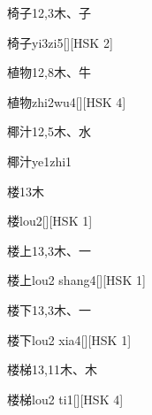 \begin{entry}{椅子}{12,3}{⽊、⼦}
  \begin{phonetics}{椅子}{yi3zi5}[][HSK 2]
  \end{phonetics}
\end{entry}

\begin{entry}{植物}{12,8}{⽊、⽜}
  \begin{phonetics}{植物}{zhi2wu4}[][HSK 4]
  \end{phonetics}
\end{entry}

\begin{entry}{椰汁}{12,5}{⽊、⽔}
  \begin{phonetics}{椰汁}{ye1zhi1}
  \end{phonetics}
\end{entry}

\begin{entry}{楼}{13}{⽊}
  \begin{phonetics}{楼}{lou2}[][HSK 1]
  \end{phonetics}
\end{entry}

\begin{entry}{楼上}{13,3}{⽊、⼀}
  \begin{phonetics}{楼上}{lou2 shang4}[][HSK 1]
  \end{phonetics}
\end{entry}

\begin{entry}{楼下}{13,3}{⽊、⼀}
  \begin{phonetics}{楼下}{lou2 xia4}[][HSK 1]
  \end{phonetics}
\end{entry}

\begin{entry}{楼梯}{13,11}{⽊、⽊}
  \begin{phonetics}{楼梯}{lou2 ti1}[][HSK 4]
  \end{phonetics}
\end{entry}

